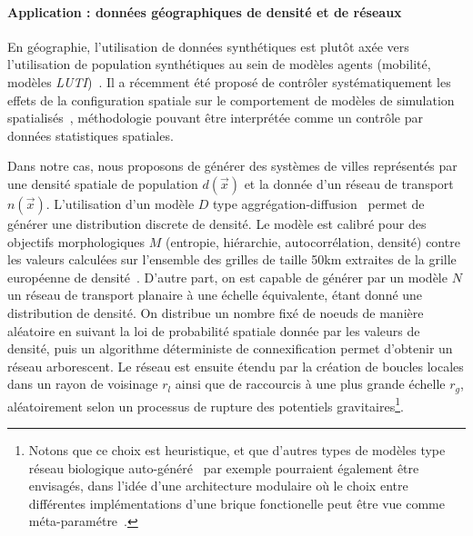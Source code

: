 \vspace{-0.4cm}
\paragraph{Application : données géographiques de densité et de réseaux}

En géographie, l'utilisation de données synthétiques est plutôt axée vers l'utilisation de population synthétiques au sein de modèles agents (mobilité, modèles \emph{LUTI})~\cite{pritchard2009advances}. Il a récemment été proposé de contrôler systématiquement les effets de la configuration spatiale sur le comportement de modèles de simulation spatialisés~\cite{cottineau2015revisiting}, méthodologie pouvant être interprétée comme un contrôle par données statistiques spatiales.

Dans notre cas, nous proposons de générer des systèmes de villes représentés par une densité spatiale de population $d(\vec{x})$ et la donnée d'un réseau de transport $n(\vec{x})$. L'utilisation d'un modèle $D$ type aggrégation-diffusion~\cite{batty2006hierarchy} permet de générer une distribution discrete de densité. Le modèle est calibré pour des objectifs morphologiques $M$ (entropie, hiérarchie, autocorrélation, densité) contre les valeurs calculées sur l'ensemble des grilles de taille 50km extraites de la grille européenne de densité~\cite{eurostat}. %
D'autre part, on est capable de générer par un modèle $N$ un réseau de transport planaire à une échelle équivalente, étant donné une distribution de densité. On distribue un nombre fixé de noeuds de manière aléatoire en suivant la loi de probabilité spatiale donnée par les valeurs de densité, puis un algorithme déterministe de connexification permet d'obtenir un réseau arborescent. Le réseau est ensuite étendu par la création de boucles locales dans un rayon de voisinage $r_l$ ainsi que de raccourcis à une plus grande échelle $r_g$, aléatoirement selon un processus de rupture des potentiels gravitaires\footnote{Notons que ce choix est heuristique, et que d'autres types de modèles type réseau biologique auto-généré~\cite{tero2006physarum} par exemple pourraient également être envisagés, dans l'idée d'une architecture modulaire où le choix entre différentes implémentations d'une brique fonctionelle peut être vue comme méta-paramétre~\cite{cottineau2015incremental}.}.

